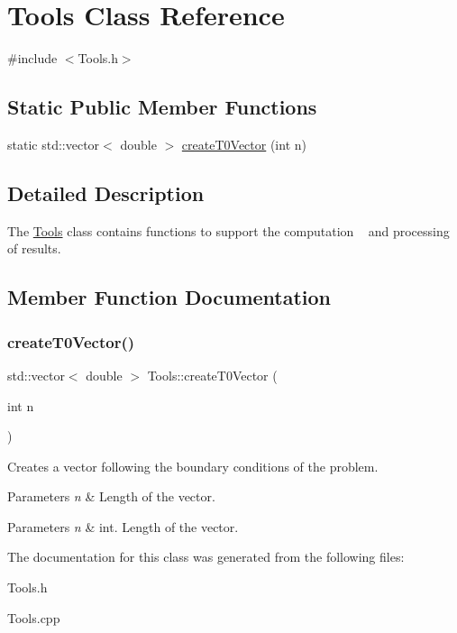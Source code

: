 \hypertarget{class_tools}{}\section{Tools Class Reference}
\label{class_tools}


{\ttfamily \#include $<$Tools.\+h$>$}

\subsection*{Static Public Member Functions}
\begin{DoxyCompactItemize}
\item 
static std\+::vector$<$ double $>$ \hyperlink{class_tools_a7e58e60636cab3c3454f16cb861792b3}{create\+T0\+Vector} (int n)
\end{DoxyCompactItemize}


\subsection{Detailed Description}
The \hyperlink{class_tools}{Tools} class contains functions to support the computation ~\newline
 and processing of results. 

\subsection{Member Function Documentation}
\mbox{\label{class_tools_a7e58e60636cab3c3454f16cb861792b3}} 
\subsubsection{\texorpdfstring{create\+T0\+Vector()}{createT0Vector()}}
{\footnotesize\ttfamily std\+::vector$<$ double $>$ Tools\+::create\+T0\+Vector (\begin{DoxyParamCaption}\item[{int}]{n }\end{DoxyParamCaption})\hspace{0.3cm}{\ttfamily [static]}}

Creates a vector following the boundary conditions of the problem. 
\begin{DoxyParams}{Parameters}
{\em n} & Length of the vector. \\
\hline
\end{DoxyParams}

\begin{DoxyParams}{Parameters}
{\em n} & int. Length of the vector. \\
\hline
\end{DoxyParams}


The documentation for this class was generated from the following files\+:\begin{DoxyCompactItemize}
\item 
Tools.\+h\item 
Tools.\+cpp\end{DoxyCompactItemize}
